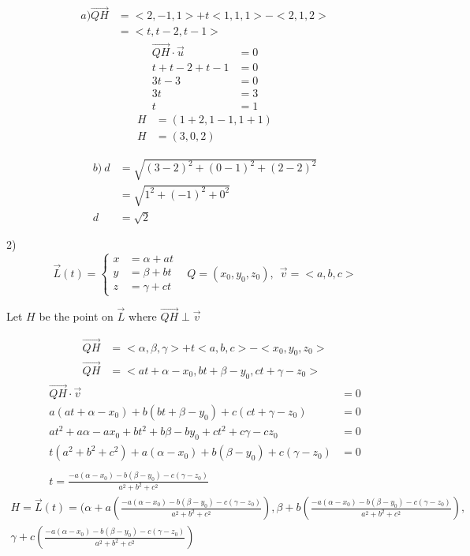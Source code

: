 \documentclass{article}
\begin{document}
\begin{align*}
a) \vec{QH} &= <2, -1, 1> + t<1,1,1> - <2,1,2> \\
&= <t, t-2, t-1>
\end{align*}
\begin{align*}
\vec{QH} \cdot \vec{u} &= 0 \\
t + t - 2 + t -1 &= 0 \\
3t - 3 &= 0 \\
3t &= 3 \\
t &= 1
\end{align*}
\begin{align*}
H &= (1+2, 1-1, 1+1) \\
H &= (3, 0, 2)
\end{align*}

\begin{align*}
b) \: d &= \sqrt{(3-2)^2 + (0-1)^2 + (2-2)^2} \\
&= \sqrt{1^2 + (-1)^2 + 0^2} \\
d &= \sqrt{2}
\end{align*}

2)
\[\vec{L}(t) = \left\{
  \begin{array}{lr}
    x &= \alpha + at \\
    y &= \beta + bt \\
    z &= \gamma + ct
  \end{array}
\right.
\;\;\;
Q = (x_0, y_0, z_0) , \:\: \vec{v} = <a, b, c>
\]
\begin{text}
Let $H$ be the point on $\vec{L}$ where $\vec{QH} \perp \vec{v}$
\end{text}

\begin{align*}
\vec{QH} &= <\alpha, \beta, \gamma> + t<a, b, c> - <x_0, y_0, z_0> \\
\vec{QH} &= <at + \alpha - x_0, bt + \beta - y_0, ct + \gamma - z_0>
\end{align*}
\begin{align*}
\vec{QH} \cdot \vec{v} &= 0 \\
a(at + \alpha - x_0) + b(bt + \beta - y_0) + c(ct + \gamma - z_0) &= 0 \\
at^2 + a\alpha - ax_0 + bt^2 + b\beta - by_0 + ct^2 + c\gamma - cz_0 &= 0 \\
t(a^2 + b^2 + c^2) + a(\alpha - x_0) + b(\beta - y_0) + c(\gamma - z_0) &= 0 \\
\\
t = \frac{-a(\alpha - x_0) - b(\beta - y_0) - c(\gamma - z_0)}{a^2+b^2+c^2}
\end{align*}
\begin{equation*}
\begin{multlined}
H = \vec{L}(t) = (\alpha + a(\frac{-a(\alpha - x_0) - b(\beta - y_0) - c(\gamma - z_0)}{a^2+b^2+c^2}), \beta + b(\frac{-a(\alpha - x_0) - b(\beta - y_0) - c(\gamma - z_0)}{a^2+b^2+c^2}), \\\gamma + c(\frac{-a(\alpha - x_0) - b(\beta - y_0) - c(\gamma - z_0)}{a^2+b^2+c^2})
\end{multlined}
\end{equation*}
\end{document}
